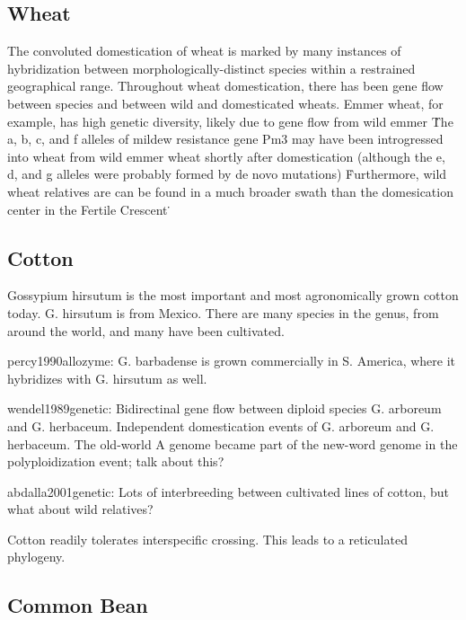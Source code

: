\documentclass[11pt]{article}
\begin{document}
\subsection*{Wheat}

The convoluted domestication of wheat is marked by many instances of hybridization between morphologically-distinct species within a restrained geographical range.
Throughout wheat domestication, there has been gene flow between species and between wild and domesticated wheats.
Emmer wheat, for example, has high genetic diversity, likely due to gene flow from wild emmer \cite{luo2007structure, dvorak2006molecular}\.
The a, b, c, and f alleles of mildew resistance gene Pm3 may have been introgressed into wheat from wild emmer wheat shortly after domestication (although the e, d, and g alleles were probably formed by de novo mutations) \cite{TPJ:TPJ2772}\.
Furthermore, wild wheat relatives are can be found in a much broader swath than the domesication center in the Fertile Crescent \cite{CWR}\.





\subsection*{Cotton}

Gossypium hirsutum is the most important and most agronomically grown cotton today.
G. hirsutum is from Mexico.
There are many species in the genus, from around the world, and many have been cultivated.

percy1990allozyme:
G. barbadense is grown commercially in S. America, where it hybridizes with G. hirsutum as well.

wendel1989genetic:
Bidirectinal gene flow between diploid species G. arboreum and G. herbaceum.
Independent domestication events of G. arboreum and G. herbaceum.
The old-world A genome became part of the new-word genome in the polyploidization event; talk about this?

abdalla2001genetic:
Lots of interbreeding between cultivated lines of cotton, but what about wild relatives?

Cotton readily tolerates interspecific crossing.
This leads to a reticulated phylogeny.







\subsection*{Common Bean}
\end{document}
